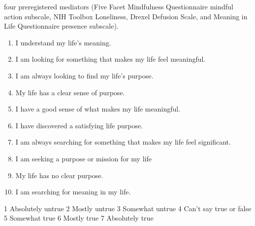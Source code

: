 \documentclass[aspectratio=169]{beamer}
\theoremstyle{remark}
\begin{document}
\begin{frame}
    four preregistered mediators (Five Facet Mindfulness Questionnaire mindful action subscale, NIH Toolbox Loneliness, Drexel Defusion Scale, and Meaning in Life Questionnaire presence subscale).

    \begin{enumerate}
        \item I understand my life's meaning.
        \item I am looking for something that makes my life feel meaningful.
        \item I am always looking to find my life's purpose.
        \item My life has a clear sense of purpose.
        \item I have a good sense of what makes my life meaningful.
        \item I have discovered a satisfying life purpose.
        \item I am always searching for something that makes my life feel significant.
        \item I am seeking a purpose or mission for my life
        \item My life has no clear purpose.
        \item I am searching for meaning in my life.
    \end{enumerate}

    1 Absolutely untrue
    2 Mostly untrue
    3 Somewhat untrue
    4 Can't say true or false
    5 Somewhat true
    6 Mostly true
    7 Absolutely true
\end{frame}
\end{document}
